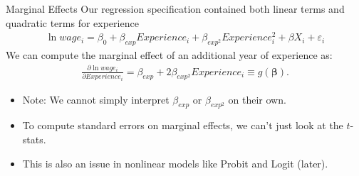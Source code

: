 \documentclass[aspectratio=169,11pt]{beamer}
\begin{document}
\begin{frame}{Marginal Effects}
Our regression specification contained both linear terms and quadratic terms for experience
\begin{align*}
\ln wage_i = \beta_0 + \beta_{exp} Experience_i + \beta_{exp^2} Experience^2_i + \beta X_i + \varepsilon_i
\end{align*}
We can compute the marginal effect of an additional year of experience as:
\begin{align*}
\frac{\partial \ln wage_i}{\partial Experience_i} = \beta_{exp} + 2 \beta_{exp^2} Experience_i \equiv g(\boldsymbol{\beta}).
\end{align*}
\begin{itemize}
\item Note: We cannot simply interpret $\beta_{exp}$ or $\beta_{exp^2}$ on their own.
\item To compute standard errors on marginal effects, we can't just look at the $t$-stats.
\item This is also an issue in \alert{nonlinear models} like Probit and Logit (later).
\end{itemize}
\end{frame}
\end{document}

